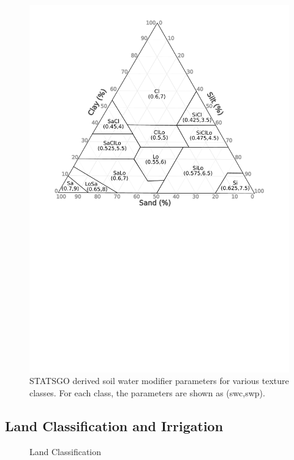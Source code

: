 \documentclass[preprint,12pt]{elsarticle}
\begin{document}
\begin{figure}
  \centering
  \includegraphics[width=1.0\linewidth]{soil_triangle}    
  \caption{\ac{STATSGO} derived soil water modifier parameters for
    various texture classes. For each class, the parameters are shown
    as (\ac{swc},\ac{swp}).}
  \label{fig:swc}
\end{figure}

\subsection{Land Classification and Irrigation}
\label{sec:land}

\begin{figure}[hp]
  \centering
  
  \caption{Land Classification}
  \label{fig:land}
\end{figure}
\end{document}

